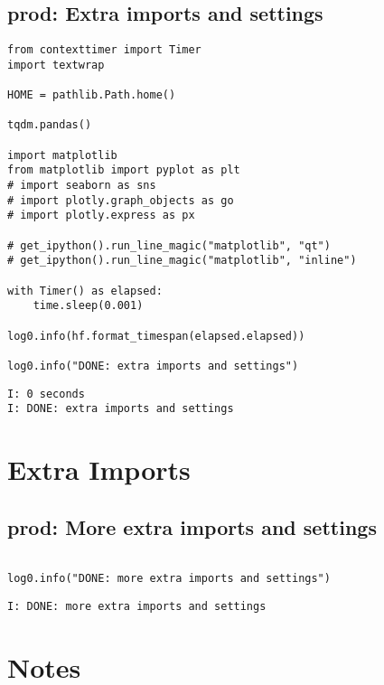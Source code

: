 \documentclass[a4paper,10pt,onecolumn,oneside,openright]{article}
\begin{document}
\subsection{prod: Extra imports and settings}
\label{sec:org6cff76a}
\begin{verbatim}
from contexttimer import Timer
import textwrap

HOME = pathlib.Path.home()

tqdm.pandas()

import matplotlib
from matplotlib import pyplot as plt
# import seaborn as sns
# import plotly.graph_objects as go
# import plotly.express as px

# get_ipython().run_line_magic("matplotlib", "qt")
# get_ipython().run_line_magic("matplotlib", "inline")

with Timer() as elapsed:
    time.sleep(0.001)

log0.info(hf.format_timespan(elapsed.elapsed))

log0.info("DONE: extra imports and settings")
\end{verbatim}

\begin{verbatim}
I: 0 seconds
I: DONE: extra imports and settings
\end{verbatim}

\section{Extra Imports}
\label{sec:orgea96c46}
\subsection{prod: More extra imports and settings}
\label{sec:org4509f2a}
\begin{verbatim}

log0.info("DONE: more extra imports and settings")
\end{verbatim}

\begin{verbatim}
I: DONE: more extra imports and settings
\end{verbatim}

\section{Notes}
\label{sec:org1762a86}
\end{document}
